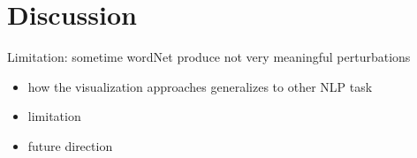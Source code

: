 \section{Discussion}


Limitation: sometime wordNet  produce not very meaningful  perturbations

\begin{itemize}
    \item how the visualization approaches generalizes to other NLP task
    \item limitation
    \item future direction
\end{itemize}
